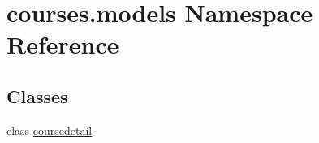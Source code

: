 \hypertarget{namespacecourses_1_1models}{}\section{courses.\+models Namespace Reference}
\label{namespacecourses_1_1models}
\subsection*{Classes}
\begin{DoxyCompactItemize}
\item 
class \hyperlink{classcourses_1_1models_1_1coursedetail}{coursedetail}
\end{DoxyCompactItemize}
